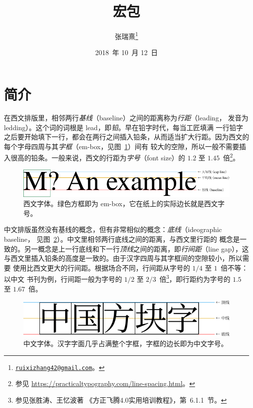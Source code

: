 \documentclass[zihao=5,a4paper]{ctexart}
\title{\vspace*{-18bp}\pkg{zhlineskip} 宏包}
\author{张瑞熹\thanks{\href{mailto:ruixizhang42@gmail.com}{\nolinkurl{ruixizhang42@gmail.com}}。}}
\date{2018~年 10~月 12~日}
\begin{document}
\maketitle

\tableofcontents

\section{简介}

在西文排版里，相邻两行\emph{基线}（baseline）之间的距离称为\emph{行距}（leading，
发音为 ledding）。这个词的词根是 lead，即\emph{铅}。早在铅字时代，每当工匠填满
一行铅字之后要开始填下一行，都会在两行之间插入铅条，从而适当扩大行距。因为西文的
每个字母四周与其\emph{字框}（em-box，见图~\ref{fig:eng-font-size}）间有
较大的空隙，所以一般不需要插入很高的铅条。一般来说，西文的行距为\emph{字号}（font
size）的 $1.2$ 至 $1.45$~倍\footnote{参见
\url{https://practicaltypography.com/line-spacing.html}。}。

\begin{figure}[h]
\centering
\includegraphics{Latinmetrics}
\caption[西文字体]{西文字体。绿色方框即为 em-box，它在纸上的实际边长就是西文字号。}
\label{fig:eng-font-size}
\end{figure}

中文排版虽然没有基线的概念，但有非常相似的概念：\emph{底线}（ideographic baseline，
见图~\ref{fig:chi-font-size}）。中文里相邻两行底线之间的距离，与西文里行距的
概念是一致的。另一概念是上一行底线和下一行\emph{顶线}之间的距离，即\emph{行间距}（line
gap），这与西文里插入铅条的高度是一致的。由于汉字四周与其字框间的空隙较小，所以需要
使用比西文更大的行间距。根据场合不同，行间距从字号的 $1/4$ 至 $1$~倍不等：以中文
书刊为例，行间距一般为字号的 $1/2$ 至 $2/3$~倍\footnote{参见张胜涛、王忆波著
《方正飞腾4.0实用培训教程》，第~6.1.1~节。}，即行距约为字号的 $1.5$ 至 $1.67$~倍。

\begin{figure}[h]
\centering
\includegraphics{CJKmetrics}
\caption[中文字体]{中文字体。汉字字面几乎占满整个字框，字框的边长即为中文字号。}
\label{fig:chi-font-size}
\end{figure}
\end{document}
